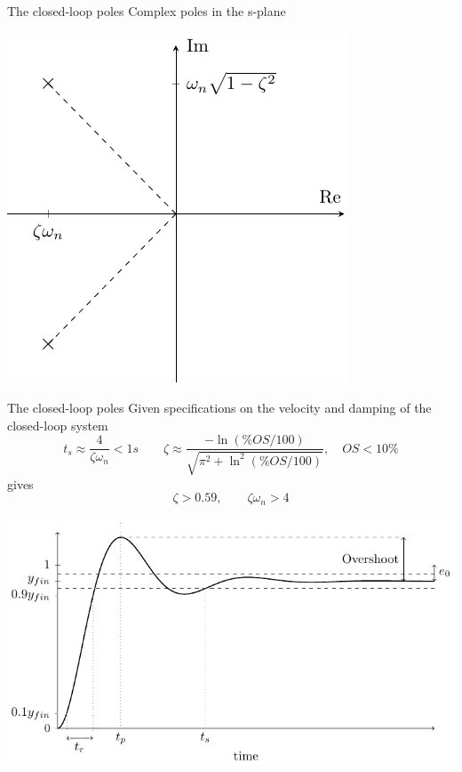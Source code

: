 \documentclass[presentation,aspectratio=169]{beamer}
\begin{document}
\begin{frame}[label={sec:org1d370d0}]{The closed-loop poles}
Complex poles in the s-plane
\begin{center}
\includegraphics[width=0.45\linewidth]{../../figures/implane-second-order-poles}
\end{center}
\end{frame}

\begin{frame}[label={sec:org190ec43}]{The closed-loop poles}
Given specifications on the velocity and damping of the closed-loop system
\[ t_s \approx \frac{4}{\zeta\omega_n} < 1 s \qquad \zeta \approx \frac{-\ln (\%OS/100)}{\sqrt{\pi^2 + \ln^2(\%OS/100)}}, \quad OS < 10\%  \]
gives
\[ \zeta > 0.59,  \qquad \zeta\omega_n > 4\]

\begin{center}
\includegraphics[width=0.6\linewidth]{../../figures/step-response-specifications}
\end{center}
\end{frame}
\end{document}
